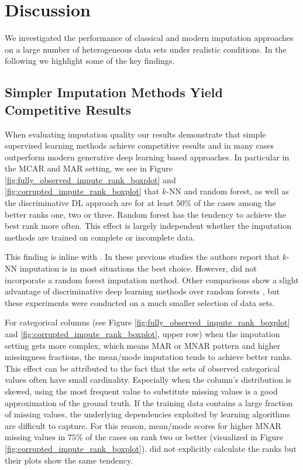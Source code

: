 \section{Discussion}
\label{sec:discussion}

We investigated the performance of classical and modern imputation approaches on a large number of heterogeneous data sets under realistic conditions. In the following we highlight some of the key findings.

\subsection{Simpler Imputation Methods Yield Competitive Results}
%
When evaluating imputation quality our results demonstrate that simple supervised learning methods achieve competitive results and in many cases outperform modern generative deep learning based approaches. In particular in the MCAR and MAR setting, we see in Figure \ref{fig:fully_observed_impute_rank_boxplot} and \ref{fig:corrupted_impute_rank_boxplot} that $k$-NN and random forest, as well as the discriminative DL approach are for at least $50\%$ of the cases among the better ranks one, two or three. Random forest has the tendency to achieve the best rank more often. This effect is largely independent whether the imputation methods are trained on complete or incomplete data.

This finding is inline with \cite{Imputation_Benchmark_3, Imputation_Benchmark_2, Imputation_Benchmark_4}. In these previous studies the authors report that $k$-NN imputation is in most situations the best choice. However, \cite{Imputation_Benchmark_2, Imputation_Benchmark_4} did not incorporate a random forest imputation method. Other comparisons show a slight advantage of discriminative deep learning methods over random forests \citep{biessmann2019datawig}, but these experiments were conducted on a much smaller selection of data sets.

For categorical columns (see Figure \ref{fig:fully_observed_impute_rank_boxplot} and \ref{fig:corrupted_impute_rank_boxplot}, upper row) when the imputation setting gets more complex, which means MAR or MNAR pattern and higher missingness fractions, the mean/mode imputation tends to achieve better ranks. This effect can be attributed to the fact that the sets of observed categorical values often have small cardinality. Especially when the column's distribution is skewed, using the most frequent value to substitute missing values is a good approximation of the ground truth. If the training data contains a large fraction of missing values, the underlying dependencies exploited by learning algorithms are difficult to capture. For this reason, mean/mode scores for higher MNAR missing values in $75\%$ of the cases on rank two or better (visualized in Figure \ref{fig:corrupted_impute_rank_boxplot}). \cite{Imputation_Benchmark_3} did not explicitly calculate the ranks but their plots show the same tendency.

